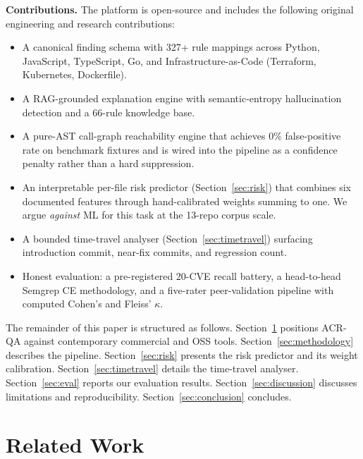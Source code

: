\documentclass[conference]{IEEEtran}
\begin{document}
\textbf{Contributions.} The platform is open-source and includes the
following original engineering and research contributions:

\begin{itemize}
  \item A canonical finding schema with 327+ rule mappings across Python,
    JavaScript, TypeScript, Go, and Infrastructure-as-Code (Terraform,
    Kubernetes, Dockerfile).
  \item A RAG-grounded explanation engine with semantic-entropy hallucination
    detection and a 66-rule knowledge base.
  \item A pure-AST call-graph reachability engine that achieves 0\%
    false-positive rate on benchmark fixtures and is wired into the pipeline
    as a confidence penalty rather than a hard suppression.
  \item An interpretable per-file risk predictor (Section~\ref{sec:risk})
    that combines six documented features through hand-calibrated weights
    summing to one. We argue \emph{against} ML for this task at the
    13-repo corpus scale.
  \item A bounded time-travel analyser (Section~\ref{sec:timetravel})
    surfacing introduction commit, near-fix commits, and regression count.
  \item Honest evaluation: a pre-registered 20-CVE recall battery, a
    head-to-head Semgrep CE methodology, and a five-rater peer-validation
    pipeline with computed Cohen's and Fleiss' $\kappa$.
\end{itemize}

The remainder of this paper is structured as follows. Section~\ref{sec:related}
positions ACR-QA against contemporary commercial and OSS tools.
Section~\ref{sec:methodology} describes the pipeline.
Section~\ref{sec:risk} presents the risk predictor and its weight calibration.
Section~\ref{sec:timetravel} details the time-travel analyser.
Section~\ref{sec:eval} reports our evaluation results.
Section~\ref{sec:discussion} discusses limitations and reproducibility.
Section~\ref{sec:conclusion} concludes.

\section{Related Work}
\label{sec:related}
\end{document}
